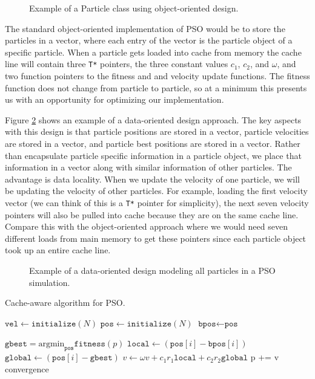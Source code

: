 \begin{figure}
  
  \caption{Example of a Particle class using object-oriented
    design.}\label{fig:particle}
\end{figure}

The standard object-oriented implementation of PSO would be to store the
particles in a vector, where each entry of the vector is the particle object of
a specific particle. When a particle gets loaded into cache from memory the
cache line will contain three \texttt{T*} pointers, the three constant values
$c_1$, $c_2$, and $\omega$, and two function pointers to the fitness and and
velocity update functions. The fitness function does not change from particle to
particle, so at a minimum this presents us with an opportunity for
optimizing our implementation.

Figure \ref{fig:particles} shows an example of a data-oriented design
approach. The key aspects with this design is that particle positions are stored
in a vector, particle velocities are stored in a vector, and particle best
positions are stored in a vector. Rather than encapsulate particle specific
information in a particle object, we place that information in a vector along
with similar information of other particles. The advantage is data
locality. When we update the velocity of one particle, we will be updating the
velocity of other particles. For example, loading the first velocity vector (we
can think of this is a \texttt{T*} pointer for simplicity), the next seven
velocity pointers will also be pulled into cache because they are on the same
cache line. Compare this with the object-oriented approach where we would need
seven different loads from main memory to get these pointers since each particle
object took up an entire cache line.
\begin{figure}
  
  \caption{Example of a data-oriented design modeling all particles in a PSO
    simulation.}\label{fig:particles}
\end{figure}

\begin{algorithm}
  \caption{Cache-aware algorithm for PSO.}\label{alg:pso-cache}
  \begin{algorithmic}[1]
    \State $\texttt{vel} \gets \texttt{initialize}(N)$ 
    \State $\texttt{pos} \gets \texttt{initialize}(N)$ 
    \State $\texttt{bpos} \gets \texttt{pos}$ 

    \Repeat
    \State $\texttt{gbest} = \text{argmin}_{\texttt{pos}}\texttt{fitness}(p)$
    \State $\texttt{local} \gets (\texttt{pos}[i] -
    \texttt{bpos}[i])$
    \State $\texttt{global} \gets  (\texttt{pos}[i]
    - \texttt{gbest})$
    \State $v \gets \omega v + c_1 r_1 \texttt{local}  + c_2 r_2 \texttt{global}$
    \EndFor
    \State p += v
    \EndFor
    \Until convergence
    \EndProcedure
  \end{algorithmic}
\end{algorithm}

